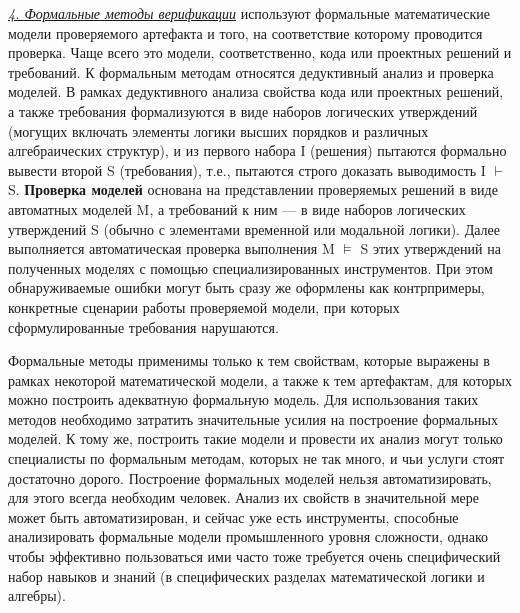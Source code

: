 \underline{\textit{4. Формальные методы верификации}} используют формальные математические модели проверяемого артефакта и того, на соответствие которому проводится проверка. Чаще всего это модели, соответственно, кода или проектных решений и требований. К формальным методам относятся дедуктивный анализ и проверка моделей. В рамках дедуктивного анализа свойства кода или проектных решений, а также требования формализуются в виде наборов логических утверждений (могущих включать элементы логики высших порядков и различных алгебраических структур), и из первого набора I (решения) пытаются формально вывести второй S
(требования), т.е., пытаются строго доказать выводимость I $\vdash$ S. \textbf{Проверка моделей} основана на представлении проверяемых решений в виде автоматных моделей M, а требований к ним — в виде наборов логических утверждений S (обычно с элементами временной или модальной логики). Далее выполняется автоматическая проверка
выполнения M $\models$ S этих утверждений на полученных моделях с помощью специализированных инструментов. При этом обнаруживаемые ошибки могут быть сразу же оформлены как контрпримеры, конкретные сценарии работы проверяемой модели, при которых сформулированные требования нарушаются.

Формальные методы применимы только к тем свойствам, которые выражены в рамках некоторой математической модели, а также к тем артефактам, для которых можно построить адекватную формальную модель. Для использования таких методов необходимо затратить значительные усилия на построение формальных моделей. К тому же, построить такие модели и провести их анализ могут только специалисты по формальным методам, которых не так много, и чьи услуги стоят достаточно дорого. Построение формальных моделей нельзя автоматизировать, для этого всегда необходим человек. Анализ их свойств в значительной мере может быть автоматизирован, и сейчас уже есть инструменты, способные анализировать формальные модели промышленного уровня сложности, однако чтобы эффективно пользоваться ими часто тоже требуется очень специфический набор навыков и знаний (в специфических разделах математической логики и алгебры).

